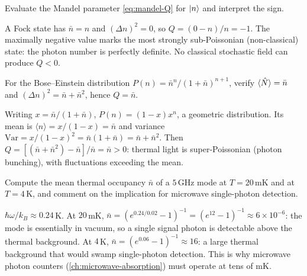 \begin{exercise}
Evaluate the Mandel parameter \cref{eq:mandel-Q} for $\ket n$ and
interpret the sign.
\begin{solution}
A Fock state has $\bar n=n$ and $(\Delta n)^2=0$, so
$Q=(0-n)/n=-1$. The maximally negative value marks the most
strongly sub-Poissonian (non-classical) state: the photon number is
perfectly definite. No classical stochastic field can produce
$Q<0$.
\end{solution}
\end{exercise}

\begin{exercise}
For the Bose--Einstein distribution
$P(n)=\bar n^n/(1+\bar n)^{n+1}$, verify $\langle\hat{N}\rangle=\bar n$
and $(\Delta n)^2=\bar n+\bar n^2$, hence $Q=\bar n$.
\begin{solution}
Writing $x=\bar n/(1+\bar n)$, $P(n)=(1-x)x^n$, a geometric
distribution. Its mean is $\langle n\rangle=x/(1-x)=\bar n$ and
variance $\mathrm{Var}=x/(1-x)^2=\bar n(1+\bar n)=\bar n+\bar n^2$.
Then $Q=[(\bar n+\bar n^2)-\bar n]/\bar n=\bar n>0$: thermal light is
super-Poissonian (photon bunching), with fluctuations exceeding the
mean.
\end{solution}
\end{exercise}

\begin{exercise}
Compute the mean thermal occupancy $\bar n$ of a $5\,$GHz mode at
$T=20\,$mK and at $T=4\,$K, and comment on the implication for
microwave single-photon detection.
\begin{solution}
$\hbar\omega/k_B\approx0.24\,$K. At $20\,$mK,
$\bar n=(e^{0.24/0.02}-1)^{-1}=(e^{12}-1)^{-1}\approx6\times10^{-6}$:
the mode is essentially in vacuum, so a single signal photon is
detectable above the thermal background. At $4\,$K,
$\bar n=(e^{0.06}-1)^{-1}\approx16$: a large thermal background that
would swamp single-photon detection. This is why microwave photon
counters (\cref{ch:microwave-absorption}) must operate at tens of
mK.
\end{solution}
\end{exercise}
